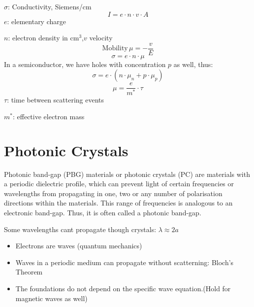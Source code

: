  \(\sigma\): Conductivity, Siemens/cm
 \[
 I = e \cdot n \cdot v \cdot A
 \]
 \(e\): elementary charge

 \(n\): electron density in \(\text{cm}^3\),\(v\) velocity
\[
\text{Mobility}\, \mu = -\frac{v}{E}
\]
\[
\sigma = e \cdot n \cdot \mu
\]
In a semiconductor, we have holes with concentration \(p\) as well, thus:
\[
\sigma = e \cdot (n\cdot \mu_n + p \cdot \mu_p)
\]
\[
\mu = \frac{e}{m^*} \cdot \tau
\]
\(\tau\): time between scattering events

\(m^*\): effective electron mass


\section{Photonic Crystals}
Photonic band-gap (PBG) materials or photonic crystals (PC) are materials
with a periodic dielectric profile,
which can prevent light of certain frequencies or wavelengths
from propagating in one, two or any number of polarisation directions
within the materials.
This range of frequencies is analogous to an electronic band-gap.
Thus, it is often called a photonic band-gap.

Some wavelengths cant propagate though crystals: \(\lambda\approx 2 a\)

\begin{itemize}
    \item Electrons are waves (quantum mechanics)
    \item Waves in a periodic medium can propagate without scatterning: Bloch's Theorem
    \item The foundations do not depend on the specific wave equation.(Hold for magnetic waves as well)
\end{itemize}


